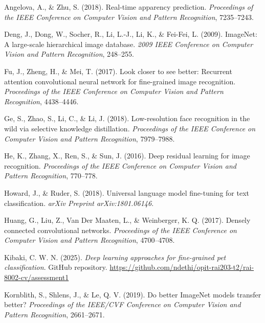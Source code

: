 \documentclass[
]{article}
\newlength{\cslhangindent}
\newenvironment{CSLReferences}[2] %
 {\begin{list}{}{%
  \setlength{\itemindent}{0pt}
  \setlength{\leftmargin}{0pt}
  \setlength{\parsep}{0pt}
  \ifodd #1
   \setlength{\leftmargin}{\cslhangindent}
   \setlength{\itemindent}{-1\cslhangindent}
  \fi
  \setlength{\itemsep}{#2\baselineskip}}}
 {\end{list}}
\begin{document}
\label{refs}
\begin{CSLReferences}{1}{0}
Angelova, A., \& Zhu, S. (2018). Real-time apparency prediction.
\emph{Proceedings of the IEEE Conference on Computer Vision and Pattern
Recognition}, 7235--7243.

Deng, J., Dong, W., Socher, R., Li, L.-J., Li, K., \& Fei-Fei, L.
(2009). ImageNet: A large-scale hierarchical image database. \emph{2009
IEEE Conference on Computer Vision and Pattern Recognition}, 248--255.

Fu, J., Zheng, H., \& Mei, T. (2017). Look closer to see better:
Recurrent attention convolutional neural network for fine-grained image
recognition. \emph{Proceedings of the IEEE Conference on Computer Vision
and Pattern Recognition}, 4438--4446.

Ge, S., Zhao, S., Li, C., \& Li, J. (2018). Low-resolution face
recognition in the wild via selective knowledge distillation.
\emph{Proceedings of the IEEE Conference on Computer Vision and Pattern
Recognition}, 7979--7988.

He, K., Zhang, X., Ren, S., \& Sun, J. (2016). Deep residual learning
for image recognition. \emph{Proceedings of the IEEE Conference on
Computer Vision and Pattern Recognition}, 770--778.

Howard, J., \& Ruder, S. (2018). Universal language model fine-tuning
for text classification. \emph{arXiv Preprint arXiv:1801.06146}.

Huang, G., Liu, Z., Van Der Maaten, L., \& Weinberger, K. Q. (2017).
Densely connected convolutional networks. \emph{Proceedings of the IEEE
Conference on Computer Vision and Pattern Recognition}, 4700--4708.

Kibaki, C. W. N. (2025). \emph{Deep learning approaches for fine-grained
pet classification}. GitHub repository.
\url{https://github.com/ndethi/opit-rai203-t2/rai-8002-cv/assessment1}

Kornblith, S., Shlens, J., \& Le, Q. V. (2019). Do better ImageNet
models transfer better? \emph{Proceedings of the IEEE/CVF Conference on
Computer Vision and Pattern Recognition}, 2661--2671.


\end{CSLReferences}
\end{document}
